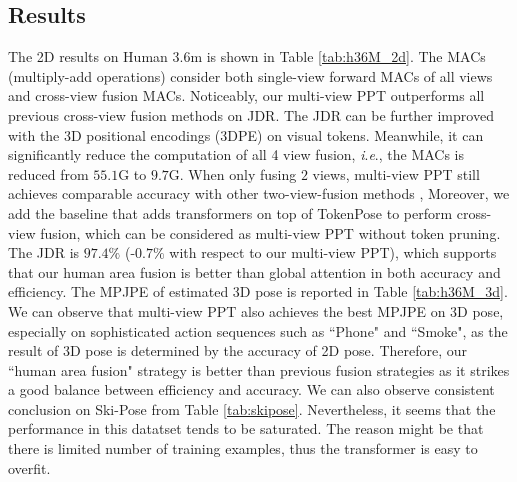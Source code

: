 \documentclass[runningheads]{llncs}
\newcommand{\ie}{\textit{i}.\textit{e}., }
\begin{document}
\subsection{Results}
\vspace{-0.5em}
The 2D results on Human 3.6m is shown in Table \ref{tab:h36M_2d}. The MACs (multiply-add operations) consider both single-view forward MACs of all views and cross-view fusion MACs. 
Noticeably, our multi-view PPT outperforms all previous cross-view fusion methods on JDR.
The JDR can be further improved with the 3D positional encodings (3DPE) \cite{ma2021transfusion} on visual tokens. 
Meanwhile, it can significantly reduce the computation of all 4 view fusion, \ie the MACs is reduced from $55.1$G to $9.7$G. 
When only fusing $2$ views, multi-view PPT still achieves comparable accuracy with other two-view-fusion methods \cite{he2020epipolar,ma2021transfusion}, 
Moreover, we add the baseline that adds transformers on top of TokenPose to perform cross-view fusion, which can be considered as multi-view PPT without token pruning.  
The JDR is $97.4\%$ (-$0.7\%$ with respect to our multi-view PPT), which supports that our human area fusion is better than global attention in both accuracy and efficiency. 
The MPJPE of estimated 3D pose is reported in Table \ref{tab:h36M_3d}. We can observe that multi-view PPT also achieves the best MPJPE on 3D pose, especially on sophisticated action sequences such as ``Phone" and ``Smoke", as the result of 3D pose is determined by the accuracy of 2D pose. 
Therefore, our ``human area fusion" strategy is better than previous fusion strategies as it strikes a good balance between efficiency and accuracy. 
We can also observe consistent conclusion on Ski-Pose from Table \ref{tab:skipose}. Nevertheless, it seems that the performance in this datatset tends to be saturated.  
The reason might be that there is limited number of training examples, thus the transformer is  easy to overfit. 



\begin{table}[t]
\centering
{}
\caption{\small{2D and 3D pose estimation accuracy comparison on Ski-Pose.} }
\label{tab:skipose}
\end{table}
\end{document}
